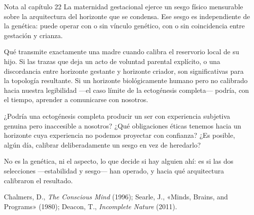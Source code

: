 \begin{notacap}{Nota al capítulo 22}
 La maternidad gestacional ejerce un sesgo físico mensurable sobre la arquitectura del horizonte que se condensa. Ese sesgo es independiente de la genética: puede operar con o sin vínculo genético, con o sin coincidencia entre gestación y crianza.

 Qué transmite exactamente una madre cuando calibra el reservorio local de su hijo. Si las trazas que deja un acto de voluntad parental explícito, o una discordancia entre horizonte gestante y horizonte criador, son significativas para la topología resultante. Si un horizonte biológicamente humano pero no calibrado hacia nuestra legibilidad —el caso límite de la ectogénesis completa— podría, con el tiempo, aprender a comunicarse con nosotros.

 ¿Podría una ectogénesis completa producir un ser con experiencia subjetiva genuina pero inaccesible a nosotros? ¿Qué obligaciones éticas tenemos hacia un horizonte cuya experiencia no podemos proyectar con confianza? ¿Es posible, algún día, calibrar deliberadamente un sesgo en vez de heredarlo?

 No es la genética, ni el aspecto, lo que decide si hay alguien ahí: es si las dos selecciones —estabilidad y sesgo— han operado, y hacia qué arquitectura calibraron el resultado.

 Chalmers, D., \emph{The Conscious Mind} (1996); Searle, J., «Minds, Brains, and Programs» (1980); Deacon, T., \emph{Incomplete Nature} (2011).
\end{notacap}
